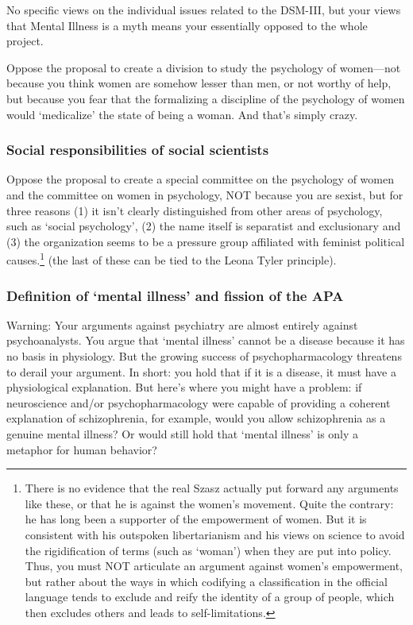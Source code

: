 \begin{refsection}
No specific views on the individual issues related to the DSM-III, but your views that Mental Illness is a myth means your essentially opposed to the whole project.

Oppose the proposal to create a division to study the psychology of women---not because you think women are somehow lesser than men, or not worthy of help, but because you fear that the formalizing a discipline of the psychology of women would ‘medicalize’ the state of being a woman. And that’s simply crazy.

\subsubsection{Social responsibilities of social scientists}
\label{socialresponsibilitiesofsocialscientists}

Oppose the proposal to create a special committee on the psychology of women and the committee on women in psychology, NOT because you are sexist, but for three reasons (1) it isn't clearly distinguished from other areas of psychology, such as `social psychology', (2) the name itself is separatist and exclusionary and (3) the organization seems to be a pressure group affiliated with feminist political causes.\footnote{There is no evidence that the real Szasz actually put forward any arguments like these, or that he is against the women's movement. Quite the contrary: he has long been a supporter of the empowerment of women. But it is consistent with his outspoken libertarianism and his views on science to avoid the rigidification of terms (such as `woman') when they are put into policy. Thus, you must NOT articulate an argument against women's empowerment, but rather about the ways in which codifying a classification in the official language tends to exclude and reify the identity of a group of people, which then excludes others and leads to self-limitations.} (the last of these can be tied to the Leona Tyler principle). 

\subsubsection{Definition of ‘mental illness’ and fission of the APA}
\label{definitionof‘mentalillness’andfissionoftheapa}

Warning: Your arguments against psychiatry are almost entirely against psychoanalysts. You argue that ‘mental illness’ cannot be a disease because it has no basis in physiology. But the growing success of psychopharmacology threatens to derail your argument. In short: you hold that if it is a disease, it must have a physiological explanation. But here’s where you might have a problem: if neuroscience and\slash or psychopharmacology were capable of providing a coherent explanation of schizophrenia, for example, would you allow schizophrenia as a genuine mental illness? Or would still hold that ‘mental illness’ is only a metaphor for human behavior?


\end{refsection}
